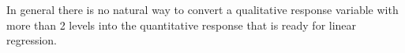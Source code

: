 In general there is no natural way to convert a qualitative response 
variable with more than 2 levels into the quantitative response that
is ready for linear regression. 
